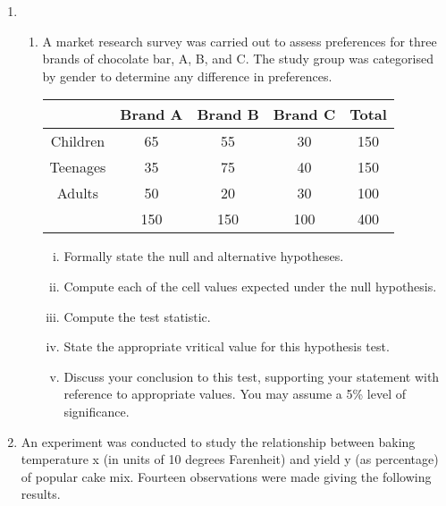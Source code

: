 \documentclass[a4paper,12pt]{article}
\begin{document}
\begin{enumerate}
\item 
\begin{enumerate}
\item A market research survey was carried out to assess preferences for three brands of chocolate bar, A, B, and C. 
The study group was categorised by gender to determine any difference in preferences.


{
	\begin{center}
		\begin{tabular}{|c||c|c|c||c|} \hline
			&	Brand A	&	Brand B	&	Brand C	&	Total	\\ \hline		\hline
			Children	&	65	&	55	&	30	&	150	\\ \hline	
			Teenages	&	35	&	75	&	40	&	150	\\ \hline	
			Adults	&	50	&	20	&	30	&	100	\\ \hline	\hline
			&	150	&	150	&	100	&	400	\\ \hline	 
		\end{tabular} 
	\end{center}
}
\begin{enumerate}[(i)]
	\item  Formally state the null and alternative hypotheses.
	\item  Compute each of the cell values expected under the null hypothesis. 
	\item  Compute the test statistic.
	\item  State the appropriate vritical value for this hypothesis test.
	\item  Discuss your conclusion to this test, supporting your statement with reference to appropriate values. You may assume a 5\% level of significance.
\end{enumerate}


\end{enumerate}



\item An experiment was conducted to study the relationship between baking temperature x (in units of 10 degrees Farenheit) and yield y (as percentage) of popular cake mix. Fourteen observations were made giving the following results.






\end{enumerate}
\end{document}
